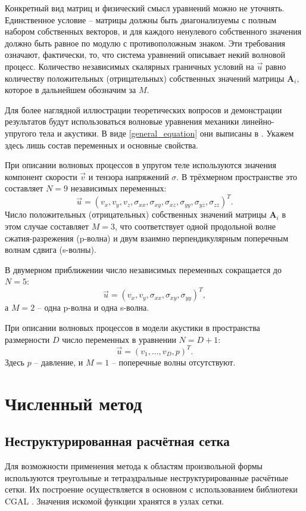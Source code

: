 \documentclass[a4paper]{article}
\numberwithin{equation}{section}
\begin{document}
Конкретный вид матриц и физический смысл уравнений можно не уточнять. 
Единственное условие -- матрицы должны быть диагонализуемы с полным набором 
собственных векторов, и для каждого ненулевого собственного значения должно быть
равное по модулю с противоположным знаком. Эти требования означают, фактически,
то, что система уравнений описывает некий волновой процесс. Количество
независимых скалярных граничных условий на $\vec{u}$ равно количеству
положительных (отрицательных) собственных значений матрицы $\mathbf{A}_i$, 
которое в дальнейшем обозначим за $M$.

Для более наглядной иллюстрации теоретических вопросов и 
демонстрации результатов будут использоваться волновые уравнения 
механики линейно-упругого тела и акустики. В виде \eqref{general_equation}
они выписаны в \cite{chelnokov}. Укажем здесь лишь состав переменных 
и основные свойства. 

При описании волновых процессов в упругом теле используются значения 
компонент скорости $\vec{v}$ и тензора напряжений $\sigma$.
В трёхмерном пространстве это составляет $N = 9$ независимых переменных:
\begin{equation}
	\vec{u} = (v_x,v_y,v_z,\sigma_{xx},\sigma_{xy},\sigma_{xz},\sigma_{yy},\sigma_{yz},\sigma_{zz})^{T}.
\end{equation}
Число положительных (отрицательных) собственных значений матрицы $\mathbf{A}_i$ 
в этом случае составляет $M = 3$, что соответствует 
одной продольной волне сжатия-разрежения (p-волна) и 
двум взаимно перпендикулярным поперечным волнам сдвига (s-волны).

В двумерном приближении число независимых переменных сокращается до $N = 5$:
\begin{equation}
	\vec{u} = (v_x,v_y,\sigma_{xx},\sigma_{xy},\sigma_{yy})^{T},
\end{equation}
а $M = 2$ -- одна p-волна и одна s-волна.

При описании волновых процессов в модели акустики 
в пространства размерности $D$ число переменных в уравнении $N = D + 1$:
\begin{equation}
	\vec{u} = (v_1, ..., v_D, p)^T.
\end{equation}
Здесь $p$ -- давление, и $M = 1$ -- поперечные волны отсутствуют.


\section{Численный метод}
\subsection{Неструктурированная расчётная сетка}
Для возможности применения метода к областям произвольной формы используются
треугольные и тетраэдральные неструктурированные расчётные сетки. 
Их построение осуществляется в основном с использованием 
библиотеки CGAL \cite{cgal}. 
Значения искомой функции хранятся в узлах сетки. 
\end{document}
